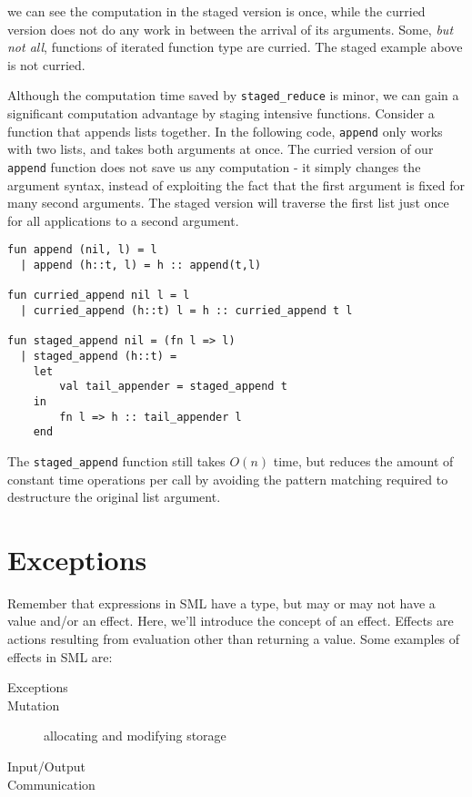 \documentclass[11pt]{article}
\begin{document}
we can see the computation in the staged version is once, while the curried version does not do any work in between the arrival of its arguments. Some, \emph{but not all}, functions of iterated function type are curried. The staged example above is not curried.

Although the computation time saved by \verb~staged_reduce~ is minor, we can gain a significant computation advantage by staging intensive functions. Consider a function that appends lists together. In the following code, \verb~append~ only works with two lists, and takes both arguments at once. The curried version of our \verb~append~ function does not save us any computation - it simply changes the argument syntax, instead of exploiting the fact that the first argument is fixed for many second arguments. The staged version will traverse the first list just once for all applications to a second argument. 

\begin{verbatim}
fun append (nil, l) = l
  | append (h::t, l) = h :: append(t,l)

fun curried_append nil l = l
  | curried_append (h::t) l = h :: curried_append t l

fun staged_append nil = (fn l => l)
  | staged_append (h::t) =
    let
	    val tail_appender = staged_append t
	in
	    fn l => h :: tail_appender l
    end
\end{verbatim}

The \verb~staged_append~ function still takes $O(n)$ time, but reduces the amount of constant time operations per call by avoiding the pattern matching required to destructure the original list argument.

\section{Exceptions}

Remember that expressions in SML have a type, but may or may not have a value and/or an effect. Here, we'll introduce the concept of an effect. Effects are actions resulting from evaluation other than returning a value. Some examples of effects in SML are:

\begin{description}
	\item[Exceptions]
	\item[Mutation] allocating and modifying storage
	\item[Input/Output]
	\item[Communication]
\end{description}
\end{document}
